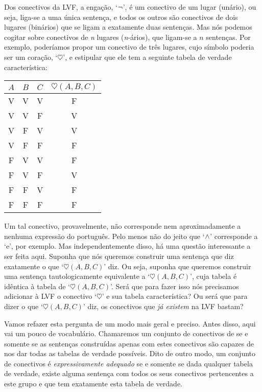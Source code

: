 Dos conectivos da LVF, a engação, `$\neg$', é um conectivo de um lugar (unário), ou seja, liga-se a uma única sentença, e todos os outros são conectivos de dois lugares (binários) que se ligam a exatamente duas sentenças.
Mas nós podemos cogitar sobre conectivos de \textit{n} lugares (\textit{n}-ários), que ligam-se a $n$ sentenças.
Por exemplo, poderíamos propor um conectivo de três lugares, cujo símbolo poderia ser um coração, `$\heartsuit$', e estipular que ele tem a seguinte tabela de verdade característica:
\begin{center}
\begin{tabular}{c c c | c}
$A$ & $B$ & $C$ & $\heartsuit(A,B,C)$\\
\hline
 V & V & V & F \\
 V & V & F & V \\
 V & F & V & V \\
 V & F & F & F \\
 F & V & V & F \\
 F & V & F & V \\
 F & F & V & F \\
 F & F & F & F
\end{tabular}
\end{center}
Um tal conectivo, provavelmente, não corresponde nem aproximadamente a nenhuma expressão do português. Pelo menos não do jeito que `$\wedge$' corresponde a `e', por exemplo.
Mas independentemente disso, há uma questão interessante a ser feita aqui. Suponha que nós queremos construir uma sentença que diz exatamente o que `$\heartsuit(A,B,C)$' diz.
Ou seja, suponha que queremos construir uma sentença tautologicamente equivalente a `$\heartsuit(A,B,C)$', cuja tabela é idêntica à tabela de `$\heartsuit(A,B,C)$'.
Será que para fazer isso nós precisamos adicionar à LVF o conectivo  `$\heartsuit$' e sua tabela característica?
Ou será que para dizer o que `$\heartsuit(A,B,C)$' diz, os conectivos que \emph{já existem} na LVF bastam?

Vamos refazer esta pergunta de um modo mais geral e preciso.
Antes disso, aqui vai um pouco de vocabulário.
Chamaremos um conjunto de conectivos de  se e somente se as sentenças construídas apenas com estes conectivos são capazes de nos dar todas as tabelas de verdade possíveis.
Dito de outro modo, um conjunto de conectivos é \emph{expressivamente adequado} se e somente se dada qualquer tabela de verdade, existe alguma sentença com todos os seus conectivos pertencentes a este grupo e que tem exatamente esta tabela de verdade.

